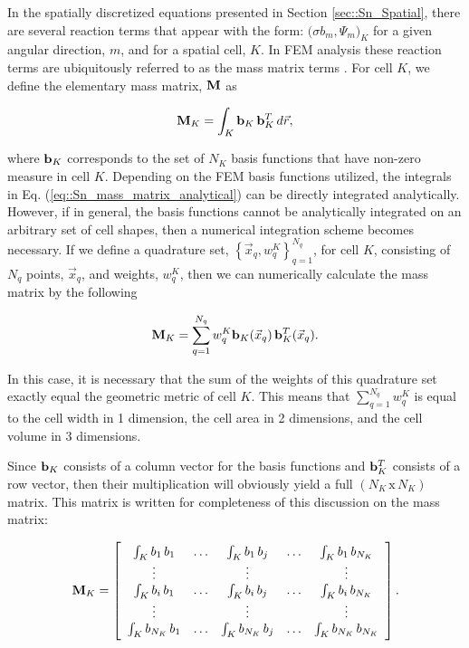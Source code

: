 In the spatially discretized equations presented in Section \ref{sec::Sn_Spatial}, there are several reaction terms that appear with the form: $\Big( \sigma  b_m , \Psi_m  \Big)_K$ for a given angular direction, $m$, and for a spatial cell, $K$. In FEM analysis these reaction terms are ubiquitously referred to as the mass matrix terms \cite{zeinkiewicz2005finite,akin1982application}. For cell $K$, we define the elementary mass matrix, ${\bf M}$ as

\begin{equation}
\label{eq::Sn_mass_matrix_analytical}
{\bf M}_K =    \int_K {\bf b}_K \, {\bf b}_K^T \, d {\vec{r}} ,
\end{equation}

\noindent where ${\bf b}_K$ corresponds to the set of $N_K$ basis functions that have non-zero measure in cell $K$. Depending on the FEM basis functions utilized, the integrals in Eq. (\ref{eq::Sn_mass_matrix_analytical}) can be directly integrated analytically. However, if in general, the basis functions cannot be analytically integrated on an arbitrary set of cell shapes, then a numerical integration scheme becomes necessary. If we define a quadrature set, $\left\{  \vec{x}_q , w_q^{K}  \right\}_{q=1}^{N_q}$, for cell $K$, consisting of $N_q$ points, $\vec{x}_q$, and weights, $w_q^K$, then we can numerically calculate the mass matrix by the following

\begin{equation}
\label{eq::Sn_mass_matrix_numerical}
{\bf M}_K =    \sum_{q = 1}^{N_q} w_{q}^K {\bf b}_K (\vec{x}_q) \, {\bf b}_K^T (\vec{x}_q)  .
\end{equation}

\noindent In this case, it is necessary that the sum of the weights of this quadrature set exactly equal the geometric metric of cell $K$. This means that $\sum_{q = 1}^{N_q} w_{q}^K$ is equal to the cell width in 1 dimension, the cell area in 2 dimensions, and the cell volume in 3 dimensions.

Since ${\bf b}_K$ consists of a column vector for the basis functions and ${\bf b}_K^{T}$ consists of a row vector, then their multiplication will obviously yield a full $(N_K \, \text{x} \, N_K)$ matrix. This matrix is written for completeness of this discussion on the mass matrix:

\begin{equation}
\label{eq::Sn_mass_matrix_array}
{\bf M}_K =   \left[
\begin{array} {ccccc}
	\int_K b_1 \, b_1  & \ldots & \int_K b_1 \, b_j  & \ldots & \int_K b_1 \, b_{N_K} \\
	\vdots  &  & \vdots  &  & \vdots \\
	\int_K b_i \, b_1  & \ldots & \int_K b_i \, b_j  & \ldots & \int_K b_i \, b_{N_K} \\
	\vdots  &  & \vdots  &  & \vdots \\
	\int_K b_{N_K} \, b_1  & \ldots & \int_K b_{N_K} \, b_j  & \ldots & \int_K b_{N_K} \, b_{N_K} \\
\end{array}
\right].
\end{equation}


